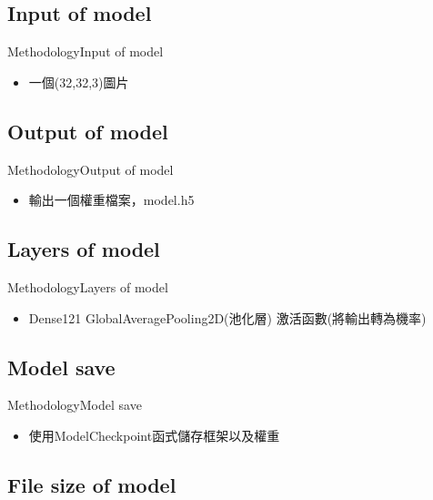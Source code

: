 \documentclass{beamer}
\begin{document}
\begin{CJK}{UTF8}{}
\subsection{Input of model}

\begin{frame}{Methodology}{Input of model}
	\begin{itemize}
	\item{
		一個(32,32,3)圖片
	}
	
	
	\end{itemize}
\end{frame}

\subsection{Output of model}

\begin{frame}{Methodology}{Output of model}
	\begin{itemize}
	\item{
		輸出一個權重檔案，model.h5
	}
	\end{itemize}
\end{frame}

\subsection{Layers of model}

\begin{frame}{Methodology}{Layers of model}
	\begin{itemize}
	\item{
		Dense121
		GlobalAveragePooling2D(池化層)
		激活函數(將輸出轉為機率)
	}
	\end{itemize}
\end{frame}

\subsection{Model save}

\begin{frame}{Methodology}{Model save}
	\begin{itemize}
	\item{
		使用ModelCheckpoint函式儲存框架以及權重
	}
	\end{itemize}
\end{frame}

\subsection{File size of model}


\end{CJK}
\end{document}
